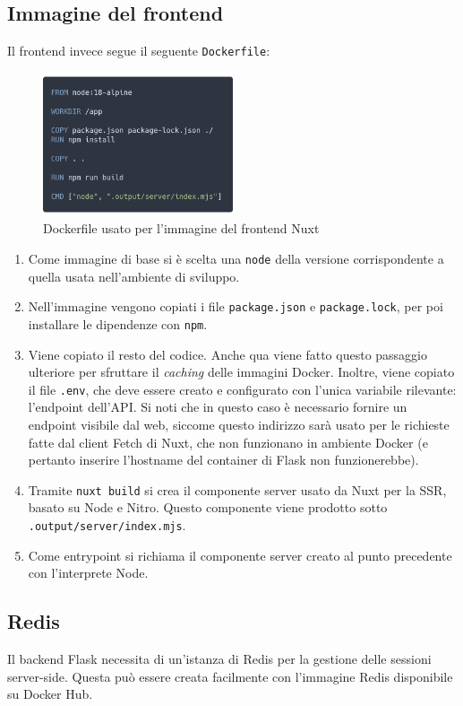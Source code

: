 \subsection{Immagine del frontend}
Il frontend invece segue il seguente \texttt{Dockerfile}:
\begin{figure}[!h]
    \centering
    \includegraphics[width=0.5\textwidth]{img/dockerfile-frontend.png}
    \caption{Dockerfile usato per l'immagine del frontend Nuxt}
\end{figure}
\begin{enumerate}
    \item Come immagine di base si è scelta una \texttt{node} della versione corrispondente a quella usata nell'ambiente di sviluppo.
    \item Nell'immagine vengono copiati i file \texttt{package.json} e \texttt{package.lock}, per poi installare le dipendenze con \texttt{npm}.
    \item Viene copiato il resto del codice. Anche qua viene fatto questo passaggio ulteriore per sfruttare il \emph{caching} delle immagini Docker. Inoltre, viene copiato il file \texttt{.env}, che deve essere creato e configurato con l'unica variabile rilevante: l'endpoint dell'API. Si noti che in questo caso è necessario fornire un endpoint visibile dal web, siccome questo indirizzo sarà usato per le richieste fatte dal client Fetch di Nuxt, che non funzionano in ambiente Docker (e pertanto inserire l'hostname del container di Flask non funzionerebbe).
    \item Tramite \texttt{nuxt build} si crea il componente server usato da Nuxt per la SSR, basato su Node e Nitro. Questo componente viene prodotto sotto \texttt{.output/server/index.mjs}.
    \item Come entrypoint si richiama il componente server creato al punto precedente con l'interprete Node.
\end{enumerate}

\subsection{Redis}
Il backend Flask necessita di un'istanza di Redis per la gestione delle sessioni server-side. Questa può essere creata facilmente con l'immagine Redis disponibile su Docker Hub.

